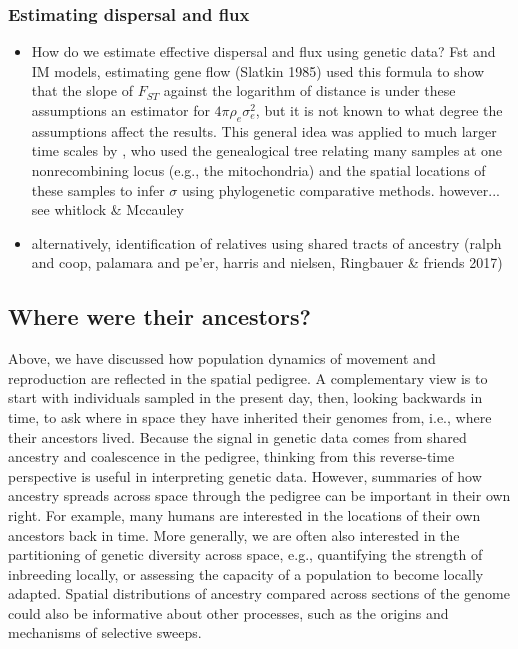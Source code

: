 \documentclass{ar-1col}
\begin{document}
\subsubsection{Estimating dispersal and flux}

\begin{itemize}
\item How do we estimate effective dispersal and flux using genetic data? 
\subitem Fst and IM models, estimating gene flow (Slatkin 1985)
\subitem \citet{rousset_1997} used this formula to show that
the slope of $F_{ST}$ against the logarithm of distance
is under these assumptions an estimator for $4 \pi \rho_e \sigma_e^2$,
but it is not known to what degree the assumptions affect the results.
\subitem This general idea was applied to much larger time scales by \citep{neigel1991estimation,neigel1993application},
who used the genealogical tree relating many samples at one nonrecombining locus
(e.g., the mitochondria) and the spatial locations of these samples
to infer $\sigma$ using phylogenetic comparative methods.
\subitem however... see whitlock \& Mccauley
\item alternatively, identification of relatives using shared tracts of ancestry
\subitem (ralph and coop, palamara and pe'er, harris and nielsen, Ringbauer \& friends 2017)
\end{itemize}


\subsection{Where were their ancestors?}

Above, we have discussed how population dynamics of movement and reproduction
are reflected in the spatial pedigree.
A complementary view is to
start with individuals sampled in the present day,
then, looking backwards in time,
to ask where in space they have inherited their genomes from, 
i.e., where their ancestors lived.
Because the signal in genetic data comes from 
shared ancestry and coalescence in the pedigree,
thinking from this reverse-time perspective 
is useful in interpreting genetic data.
However, summaries of how ancestry spreads across space 
through the pedigree can be important in their own right.
For example, many humans are interested
in the locations of their own ancestors back in time.
More generally,
we are often also interested in the partitioning of genetic diversity across space,
e.g.,
quantifying the strength of inbreeding locally,
or assessing the capacity of a population to become locally adapted.
Spatial distributions of ancestry compared across sections of the genome
could also be informative about 
other processes, such as
the origins and mechanisms of selective sweeps.
\end{document}
